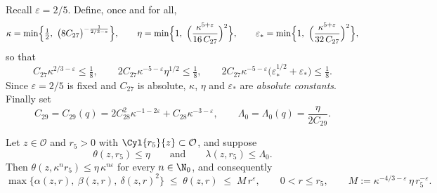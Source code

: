 \documentclass[11pt,reqno]{amsart}
\begin{document}
\begin{convention}\label{conv:kappa}
Recall $\varepsilon=2/5$. Define, once and for all,
\begin{equation}\label{eq:kappa-eta}
  \kappa=\min\Bigl\{\tfrac12,\ \bigl(8C_{27}\bigr)^{-\frac{1}{2/3-\varepsilon}}\Bigr\},
  \qquad
  \eta=\min\Bigl\{1,\ \Bigl(\frac{\kappa^{5+\varepsilon}}{16\,C_{27}}\Bigr)^{2}\Bigr\},
  \qquad
  \varepsilon_{*}=\min\Bigl\{1,\ \Bigl(\frac{\kappa^{5+\varepsilon}}{32\,C_{27}}\Bigr)^{2}\Bigr\},
\end{equation}
so that
\begin{equation}\label{eq:kappa-props}
  C_{27}\kappa^{2/3-\varepsilon}\le\tfrac18,
  \qquad
  2C_{27}\kappa^{-5-\varepsilon}\eta^{1/2}\le\tfrac18,
  \qquad
  2C_{27}\kappa^{-5-\varepsilon}\bigl(\varepsilon_{*}^{1/2}+\varepsilon_{*}\bigr)\le\tfrac18 .
\end{equation}
Since $\varepsilon=2/5$ is fixed and $C_{27}$ is absolute, $\kappa$, $\eta$ and
$\varepsilon_{*}$ are \emph{absolute constants}. Finally set
\begin{equation}\label{eq:C29}
  C_{29}=C_{29}(q)=2C_{28}^{2}\kappa^{-1-2\varepsilon}+C_{28}\kappa^{-3-\varepsilon},
  \qquad
  \Lambda_{0}=\Lambda_{0}(q)=\frac{\eta}{2C_{29}} .
\end{equation}
\end{convention}

\begin{proposition}\label{prop:iteration}
Let $z\in\mathcal{O}$ and $r_{5}>0$ with $\Cyl{r_{5}}{z}\subset\mathcal{O}$, and
suppose
\begin{equation}\label{eq:iteration-hyp}
  \theta(z,r_{5})\le\eta
  \qquad\text{and}\qquad
  \lambda(z,r_{5})\le\Lambda_{0}.
\end{equation}
Then $\theta(z,\kappa^{n}r_{5})\le\eta\,\kappa^{n\varepsilon}$ for every
$n\in\N_{0}$, and consequently
\begin{equation}\label{eq:iteration-concl}
  \max\bigl\{\alpha(z,r),\ \beta(z,r),\ \delta(z,r)^{2}\bigr\}
  \;\le\;\theta(z,r)\;\le\;M\,r^{\varepsilon},
  \qquad 0<r\le r_{5},\qquad
  M:=\kappa^{-4/3-\varepsilon}\,\eta\,r_{5}^{-\varepsilon}.
\end{equation}
\end{proposition}
\end{document}
